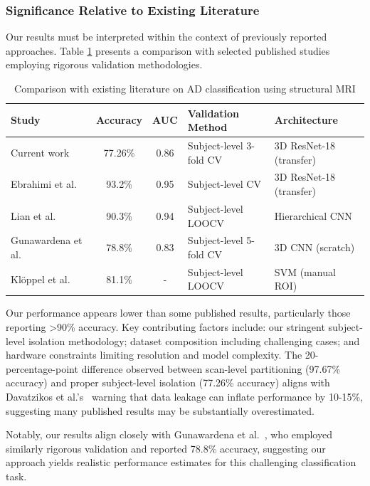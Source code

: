 \documentclass[12pt, a4paper]{article}
\begin{document}
\subsubsection{Significance Relative to Existing Literature}

Our results must be interpreted within the context of previously reported approaches. Table \ref{tab:literature_comparison} presents a comparison with selected published studies employing rigorous validation methodologies.

\begin{table}[htbp]
\centering
\begin{tabular}{|l|c|c|p{2.5cm}|p{2.5cm}|}
\hline
\textbf{Study} & \textbf{Accuracy} & \textbf{AUC} & \textbf{Validation Method} & \textbf{Architecture} \\
\hline
Current work & 77.26\% & 0.86 & Subject-level 3-fold CV & 3D ResNet-18 (transfer) \\
\hline
Ebrahimi et al.~\cite{ebrahimi2019transfer} & 93.2\% & 0.95 & Subject-level CV & 3D ResNet-18 (transfer) \\
\hline
Lian et al.~\cite{lian2018hierarchical} & 90.3\% & 0.94 & Subject-level LOOCV & Hierarchical CNN \\
\hline
Gunawardena et al.~\cite{gunawardena2017applying} & 78.8\% & 0.83 & Subject-level 5-fold CV & 3D CNN (scratch) \\
\hline
Klöppel et al.~\cite{kloppel2008accuracy} & 81.1\% & - & Subject-level LOOCV & SVM (manual ROI) \\
\hline
\end{tabular}
\caption{Comparison with existing literature on AD classification using structural MRI}
\label{tab:literature_comparison}
\end{table}

Our performance appears lower than some published results, particularly those reporting >90\% accuracy. Key contributing factors include: our stringent subject-level isolation methodology; dataset composition including challenging cases; and hardware constraints limiting resolution and model complexity. The 20-percentage-point difference observed between scan-level partitioning (97.67\% accuracy) and proper subject-level isolation (77.26\% accuracy) aligns with Davatzikos et al.'s~\cite{davatzikos2019machine} warning that data leakage can inflate performance by 10-15\%, suggesting many published results may be substantially overestimated.

Notably, our results align closely with Gunawardena et al.~\cite{gunawardena2017applying}, who employed similarly rigorous validation and reported 78.8\% accuracy, suggesting our approach yields realistic performance estimates for this challenging classification task.
\end{document}
